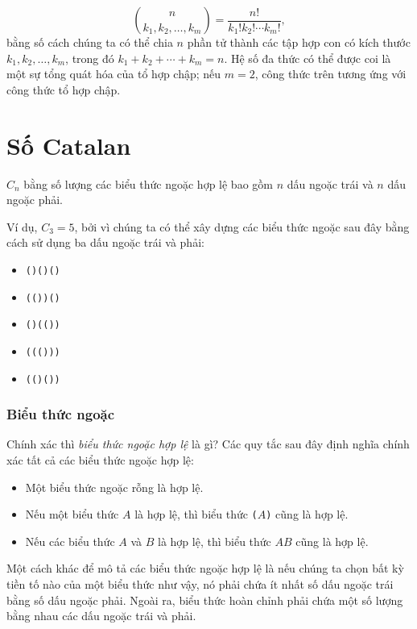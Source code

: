 \[ {n \choose k_1,k_2,\ldots,k_m} = \frac{n!}{k_1! k_2! \cdots k_m!}, \]
bằng số cách
chúng ta có thể chia $n$ phần tử thành các tập hợp con
có kích thước $k_1,k_2,\ldots,k_m$,
trong đó $k_1+k_2+\cdots+k_m=n$.
Hệ số đa thức có thể được coi là một
sự tổng quát hóa của tổ hợp chập;
nếu $m=2$, công thức trên
tương ứng với công thức tổ hợp chập.

\section{Số Catalan}


$C_n$ bằng
số lượng các biểu thức
ngoặc hợp lệ bao gồm
$n$ dấu ngoặc trái và $n$ dấu ngoặc phải.

Ví dụ, $C_3=5$, bởi vì
chúng ta có thể xây dựng các biểu thức ngoặc
sau đây bằng cách sử dụng ba
dấu ngoặc trái và phải:

\begin{itemize}[noitemsep]
\item \texttt{()()()}
\item \texttt{(())()}
\item \texttt{()(())}
\item \texttt{((()))}
\item \texttt{(()())}
\end{itemize}

\subsubsection{Biểu thức ngoặc}


Chính xác thì \emph{biểu thức ngoặc hợp lệ} là gì?
Các quy tắc sau đây định nghĩa chính xác tất cả
các biểu thức ngoặc hợp lệ:

\begin{itemize}
\item Một biểu thức ngoặc rỗng là hợp lệ.
\item Nếu một biểu thức $A$ là hợp lệ,
thì biểu thức
\texttt{(}$A$\texttt{)} cũng là hợp lệ.
\item Nếu các biểu thức $A$ và $B$ là hợp lệ,
thì biểu thức $AB$ cũng là hợp lệ.
\end{itemize}

Một cách khác để mô tả các
biểu thức ngoặc hợp lệ là nếu
chúng ta chọn bất kỳ tiền tố nào của một biểu thức như vậy,
nó phải chứa ít nhất số dấu ngoặc trái
bằng số dấu ngoặc phải.
Ngoài ra, biểu thức hoàn chỉnh phải
chứa một số lượng bằng nhau các dấu ngoặc trái và phải.

